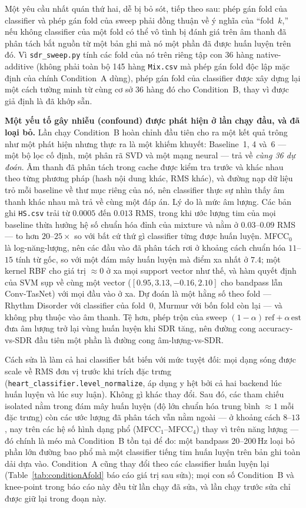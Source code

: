 \documentclass[11pt]{article}
\begin{document}
Một yêu cầu nhất quán thứ hai, dễ bị bỏ sót, tiếp theo sau: phép gán fold
của classifier và phép gán fold của sweep phải đồng thuận về ý nghĩa của
``fold~$k$,'' nếu không classifier của một fold có thể vô tình bị đánh
giá trên âm thanh đã phân tách bắt nguồn từ một bản ghi mà nó một phần
đã được huấn luyện trên đó. Vì \texttt{sdr\_sweep.py} tính các fold của
nó trên riêng tập con 36 hàng native-additive (không phải toàn bộ 145
hàng \texttt{Mix.csv} mà phép gán fold độc lập mặc định của chính
Condition~A dùng), phép gán fold của classifier được xây dựng lại một
cách tường minh từ cùng cơ sở 36 hàng đó cho Condition~B, thay vì được
giả định là đã khớp sẵn.

\textbf{Một yếu tố gây nhiễu (confound) được phát hiện ở lần chạy đầu,
và đã loại bỏ.} Lần chạy Condition~B hoàn chỉnh đầu tiên cho ra một kết
quả trông như một phát hiện nhưng thực ra là một khiếm khuyết:
Baseline~1, 4 và~6 --- một bộ lọc cố định, một phân rã SVD và một mạng
neural --- trả về \emph{cùng 36 dự đoán}. Âm thanh đã phân tách trong
cache được kiểm tra trước và khác nhau theo từng phương pháp (hash nội
dung khác, RMS khác), và đường nạp dữ liệu trỏ mỗi baseline về thư mục
riêng của nó, nên classifier thực sự nhìn thấy âm thanh khác nhau mà trả
về cùng một đáp án. Lý do là mức âm lượng. Các bản ghi \texttt{HS.csv}
trải từ $0.0005$ đến $0.013$ RMS, trong khi ước lượng tim của mọi baseline
thừa hưởng hệ số chuẩn hóa đỉnh của mixture và nằm ở $0.03$--$0.09$ RMS
--- to hơn $20$--$25\times$ so với bất cứ thứ gì classifier từng được
huấn luyện. MFCC$_0$ là log-năng-lượng, nên các đầu vào đã phân tách rơi
ở khoảng cách chuẩn hóa $11$--$15$ tính từ gốc, so với một đám mây huấn
luyện mà điểm xa nhất ở $7.4$; một kernel RBF cho giá trị $\approx 0$ ở xa
mọi support vector như thế, và hàm quyết định của SVM sụp về cùng một
vector ($[0.95, 3.13, -0.16, 2.10]$ cho bandpass lẫn Conv-TasNet) với mọi
đầu vào ở xa. Dự đoán là một hằng số theo fold --- Rhythm Disorder với
classifier của fold~0, Murmur với bốn fold còn lại --- và không phụ thuộc
vào âm thanh. Tệ hơn, phép trộn của sweep
$(1-\alpha)\,\text{ref} + \alpha\,\text{est}$ đưa âm lượng trở lại
vùng huấn luyện khi SDR tăng, nên đường cong accuracy-vs-SDR đầu tiên một
phần là đường cong âm-lượng-vs-SDR.

Cách sửa là làm cả hai classifier bất biến với mức tuyệt đối: mọi dạng
sóng được scale về RMS đơn vị trước khi trích đặc trưng
(\texttt{heart\_classifier.level\_normalize}, áp dụng y hệt bởi cả hai
backend lúc huấn luyện và lúc suy luận). Không gì khác thay đổi. Sau đó,
các tham chiếu isolated nằm trong đám mây huấn luyện (độ lớn chuẩn hóa
trung bình $\approx 1$ mỗi đặc trưng) còn các ước lượng đã phân tách vẫn
nằm ngoài --- ở khoảng cách $8$--$13$, nay trên các hệ số hình dạng phổ
(MFCC$_1$--MFCC$_4$) thay vì trên năng lượng --- đó chính là méo mà
Condition~B tồn tại để đo: một bandpass 20--200\,Hz loại bỏ phần lớn
đường bao phổ mà một classifier tiếng tim huấn luyện trên bản ghi toàn
dải dựa vào. Condition~A cũng thay đổi theo các classifier huấn luyện lại
(Table~\ref{tab:conditionAfold} báo cáo giá trị sau sửa); mọi con số
Condition~B và knee-point trong báo cáo này đều từ lần chạy đã sửa, và
lần chạy trước sửa chỉ được giữ lại trong đoạn này.
\end{document}
